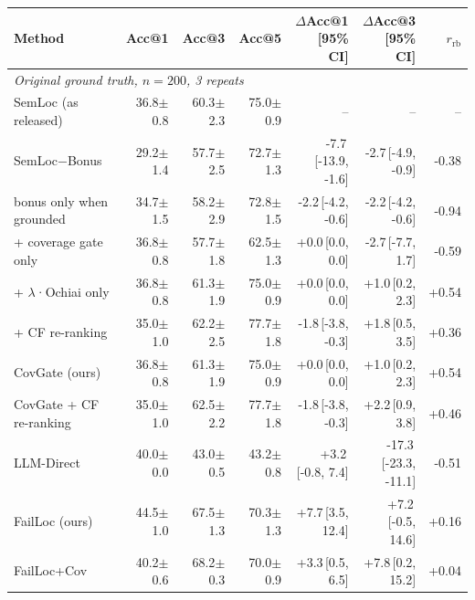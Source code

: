 \begin{tabular}{lrrrrrr}
\toprule
Method & Acc@1 & Acc@3 & Acc@5 & $\Delta$Acc@1 [95\% CI] & $\Delta$Acc@3 [95\% CI] & $r_{\text{rb}}$ \\
\midrule
\multicolumn{7}{l}{\emph{Original ground truth, $n=200$, 3 repeats}} \\
SemLoc (as released) & 36.8{\scriptsize$\pm$0.8} & 60.3{\scriptsize$\pm$2.3} & 75.0{\scriptsize$\pm$0.9} & -- & -- & -- \\
SemLoc−Bonus & 29.2{\scriptsize$\pm$1.4} & 57.7{\scriptsize$\pm$2.5} & 72.7{\scriptsize$\pm$1.3} & -7.7{\scriptsize\,[-13.9, -1.6]} & -2.7{\scriptsize\,[-4.9, -0.9]} & -0.38 \\
\quad bonus only when grounded & 34.7{\scriptsize$\pm$1.5} & 58.2{\scriptsize$\pm$2.9} & 72.8{\scriptsize$\pm$1.5} & -2.2{\scriptsize\,[-4.2, -0.6]} & -2.2{\scriptsize\,[-4.2, -0.6]} & -0.94 \\
\quad + coverage gate only & 36.8{\scriptsize$\pm$0.8} & 57.7{\scriptsize$\pm$1.8} & 62.5{\scriptsize$\pm$1.3} & +0.0{\scriptsize\,[0.0, 0.0]} & -2.7{\scriptsize\,[-7.7, 1.7]} & -0.59 \\
\quad + $\lambda$·Ochiai only & 36.8{\scriptsize$\pm$0.8} & 61.3{\scriptsize$\pm$1.9} & 75.0{\scriptsize$\pm$0.9} & +0.0{\scriptsize\,[0.0, 0.0]} & +1.0{\scriptsize\,[0.2, 2.3]} & +0.54 \\
\quad + CF re-ranking & 35.0{\scriptsize$\pm$1.0} & 62.2{\scriptsize$\pm$2.5} & 77.7{\scriptsize$\pm$1.8} & -1.8{\scriptsize\,[-3.8, -0.3]} & +1.8{\scriptsize\,[0.5, 3.5]} & +0.36 \\
CovGate (ours) & 36.8{\scriptsize$\pm$0.8} & 61.3{\scriptsize$\pm$1.9} & 75.0{\scriptsize$\pm$0.9} & +0.0{\scriptsize\,[0.0, 0.0]} & +1.0{\scriptsize\,[0.2, 2.3]} & +0.54 \\
CovGate + CF re-ranking & 35.0{\scriptsize$\pm$1.0} & 62.5{\scriptsize$\pm$2.2} & 77.7{\scriptsize$\pm$1.8} & -1.8{\scriptsize\,[-3.8, -0.3]} & +2.2{\scriptsize\,[0.9, 3.8]} & +0.46 \\
LLM-Direct & 40.0{\scriptsize$\pm$0.0} & 43.0{\scriptsize$\pm$0.5} & 43.2{\scriptsize$\pm$0.8} & +3.2{\scriptsize\,[-0.8, 7.4]} & -17.3{\scriptsize\,[-23.3, -11.1]} & -0.51 \\
FailLoc (ours) & 44.5{\scriptsize$\pm$1.0} & 67.5{\scriptsize$\pm$1.3} & 70.3{\scriptsize$\pm$1.3} & +7.7{\scriptsize\,[3.5, 12.4]} & +7.2{\scriptsize\,[-0.5, 14.6]} & +0.16 \\
FailLoc+Cov & 40.2{\scriptsize$\pm$0.6} & 68.2{\scriptsize$\pm$0.3} & 70.0{\scriptsize$\pm$0.9} & +3.3{\scriptsize\,[0.5, 6.5]} & +7.8{\scriptsize\,[0.2, 15.2]} & +0.04 \\

\end{tabular}
